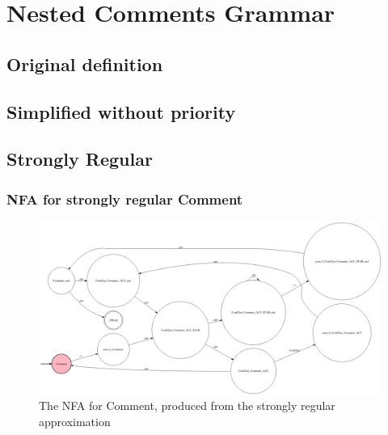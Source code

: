 
\chapter{Nested Comments Grammar} %

\label{app:comments} %

\section{Original definition} \label{app:comments:contexts}


\section{Simplified without priority} \label{app:comments:simple}


\section{Strongly Regular} \label{app:comments:stronglyregular}


\pagebreak\subsection{NFA for strongly regular Comment}
\begin{figure}[h!]
	\centering
	\includegraphics[width=\textwidth, keepaspectratio]{Figures/comment_nfa.png}
	\decoRule
 	\caption[NFA for Comment]{The NFA for Comment, produced from the strongly regular approximation}
 	\label{fig:comments:NFA:Comment}
\end{figure}

